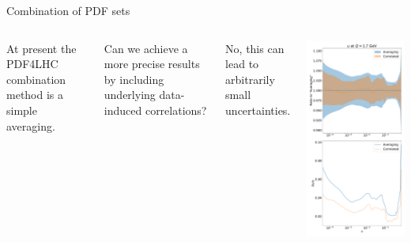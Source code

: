 \documentclass[aspectratio=169,10pt]{beamer}
\begin{document}
\begin{frame}{Combination of PDF sets}
    	\begin{columns}[t]

			At present the PDF4LHC combination method is a simple averaging. 

        	\vspace{0.2cm}

			Can we achieve a more precise results by including underlying data-induced correlations?

        	\vspace{0.2cm}

			No, this can lead to arbitrarily small uncertainties.

       	\vspace{-1.5cm}
       	\begin{center}
       		\includegraphics[height=0.9\textheight]{corr/ratio_2.pdf}

\end{center}
\end{columns}
\end{frame}
\end{document}
